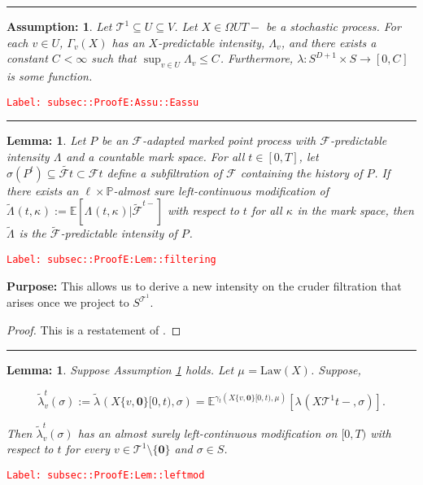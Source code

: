 \documentclass[12pt]{article}
\newcommand{\mb}{\mathbb}
\newcommand{\mc}{\mathcal}
\newcommand{\ra}{\rightarrow}
\newcommand{\te}{\text}
\newcommand{\tr}{\textcolor{red}}
\newcommand{\labe}[1]{\tr{\texttt{Label: #1}}}
\newcommand{\purpose}{\textbf{Purpose: }}
\newcommand{\lin}{\rule{\linewidth}{0.4 pt}}
\newcommand{\pr}{\mb{P}}							%
\newcommand{\ex}[1]{\mb{E}\left[#1\right]}			%
\newcommand{\exmu}[2]{\mb{E}^{#1}\left[#2\right]}	%
\renewcommand{\root}{\mathbf{0}}				%
\renewcommand{\v}{v}							%
\renewcommand{\U}{U}							%
\renewcommand{\S}{S}							%
\newcommand{\s}{\sigma}							%
\newcommand{\T}{T}								%
\renewcommand{\t}{t}							%
\newcommand{\F}{\mc{F}}							%
\newcommand{\X}{X}								%
\newcommand{\degr}{D}								%
\newcommand{\law}{\te{Law}}							%
\newcommand{\pup}[1]{^{#1}}							%
\newcommand{\tree}{\mc{T}}							%
\newcommand{\V}{V}									%
\newcommand{\rp}[1]{P^{#1}}							%
\newcommand{\m}[3]{\mu_{#2#1}^{#3}}						%
\newcommand{\cm}{\gamma}							%
\newcommand{\rate}[1]{\lambda_{#1}}					%
\newcommand{\ratee}[1]{\Lambda_{#1}}				%
\newcommand{\crate}[2]{\alt{\lambda}_{#1}^{#2}}		%
\newcommand{\cratee}[2]{\alt{\Lambda}_{#1}^{#2}} 	%
\newcommand{\const}[1]{C_{#1}}						%
\newcommand{\Sm}{\ell}								%
\newcommand{\alt}{\widetilde}						%
\renewcommand{\mark}[1]{\kappa^{#1}}				%
\newcommand{\pmap}[1]{\Gamma_{#1}}				%
\newtheorem{lem}[thms]{Lemma: }
\newtheorem{assu}[thms]{Assumption: }
\begin{document}
\lin

\begin{assu}
Let \(\tree\pup{1}\subseteq\U \subseteq \V\). Let \(\X{}{}\in \Omega{\U}{\T-}\) be a stochastic process. For each \(\v\in \U\), \(\pmap{\v}(\X{}{})\) has an \(\X{}{}\)-predictable intensity, \(\ratee{\v}\), and there exists a constant \(\const{} < \infty\) such that \(\sup_{\v\in\U} \ratee{\v} \leq \const{}\). Furthermore, \(\lambda: \S^{\degr+1}\times \S\ra[0,\const{}]\) is some function.
\label{subsec::ProofE:Assu::Eassu}
\end{assu}
\labe{subsec::ProofE:Assu::Eassu}

\lin

\begin{lem}
Let \(\rp{}\) be an \(\F{}{}\)-adapted marked point process with \(\F{}{}\)-predictable intensity \(\ratee{}\) and a countable mark space. For all \(\t \in [0,\T]\), let \(\sigma(\rp{\t}) \subseteq \alt{\F{}{\t}}\subset \F{}{\t}\) define a subfiltration of \(\F{}{}\) containing the history of \(\rp{}\). If there exists an \(\Sm\times \pr\)-almost sure left-continuous modification of \(\cratee{}{}(\t,\mark{}) := \ex{\ratee{}(\t,\mark{})|\alt{\F{}{}}^{\t-}}\) with respect to \(\t\) for all \(\mark{}\) in the mark space, then \(\cratee{}{}\) is the \(\alt{\F{}{}}\)-predictable intensity of \(\rp{}\).
\label{subsec::ProofE:Lem::filtering}
\end{lem}
\labe{subsec::ProofE:Lem::filtering}

\purpose This allows us to derive a new intensity on the cruder filtration that arises once we project to \(\S^{\tree^1}\).

\begin{proof}
This is a restatement of \cite[Theorem 14.3.III]{DalVer08}.
\end{proof}

\lin

\begin{lem}
Suppose Assumption \ref{subsec::ProofE:Assu::Eassu} holds. Let \(\m{}{}{} = \law(\X{}{})\). Suppose,

\[\crate{\v}{\t}(\s) := \crate{}{}(\X{\{\v,\root\}}{[0,\t)},\s) = \exmu{\cm_\t(\X{\{\v,\root\}}{[0,\t)},\m{}{}{})}{\rate{}(\X{\tree\pup{1}}{\t-},\s)}.\]


Then \(\crate{\v}{\t}(\s)\) has an almost surely left-continuous modification on \([0,\T)\) with respect to \(\t\) for every \(\v \in \tree\pup{1}\setminus\{\root\}\) and \(\s \in \S\).
\label{subsec::ProofE:Lem::leftmod}
\end{lem}
\labe{subsec::ProofE:Lem::leftmod}
\end{document}
